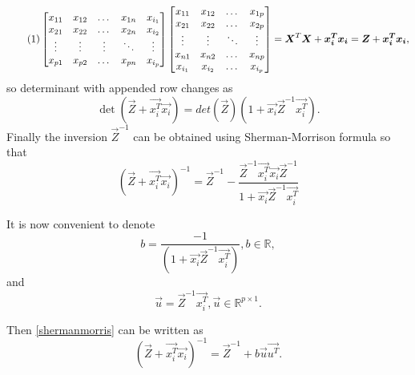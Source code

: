 \[ \numberthis \label{addedrow}
\begin{bmatrix}
    x_{11} & x_{12} & \dots  & x_{1n} & x_{i_1}  \\
    x_{21} & x_{22} & \dots  & x_{2n} & x_{i_2} \\
    \vdots & \vdots & \vdots & \ddots & \vdots \\
    x_{p1} & x_{p2} & \dots  & x_{pn} & x_{i_p}     
\end{bmatrix}
\begin{bmatrix}
    x_{11} & x_{12}  & \dots  & x_{1p} \\
    x_{21} & x_{22}  & \dots  & x_{2p} \\
    \vdots  & \vdots & \ddots & \vdots \\
    x_{n1} & x_{n2}  & \dots  & x_{np} \\
    x_{i_1} & x_{i_2}  & \dots  & x_{i_p}
\end{bmatrix}
 = \vec{X}^T\vec{X} + \vec{x_i^T}\vec{x_i} = \vec{Z} + \vec{x_i^T}\vec{x_i},
\]
so determinant with appended row changes as
\begin{equation} \label{udpateddeterminant}
    \det(\vec{Z} + \vec{x_i^T}\vec{x_i}) = det(\vec{Z})(1 + \vec{x_i}\vec{Z}^{-1}\vec{x_i^T}).
\end{equation}
Finally the inversion $\vec{Z}^{-1}$ can be obtained using Sherman-Morrison formula \cite{bartlett1951inverse} so that 
\begin{equation} \label{shermanmorris}
    (\vec{Z} + \vec{x_i^T}\vec{x_i})^{-1} = \vec{Z}^{-1} - \dfrac{\vec{Z}^{-1}\vec{x_i^T}\vec{x_i}\vec{Z}^{-1}}{1 + \vec{x_i}\vec{Z}^{-1}\vec{x_i^T}}
\end{equation}

It is now convenient to denote 
\begin{equation}
    b = \dfrac{-1}{(1 + \vec{x_i}\vec{Z}^{-1}\vec{x_i^T})},  b \in \mathbb{R},
\end{equation}
and 
\begin{equation} \label{agullo_u}
    \vec{u} = \vec{Z}^{-1}\vec{x_i^T},      \vec{u} \in \mathbb{R}^{p \times 1}.
\end{equation}

Then \eqref{shermanmorris} can be written as
\begin{equation} \label{inversionplus}
    (\vec{Z} + \vec{x_i^T}\vec{x_i})^{-1} = \vec{Z}^{-1} + b\vec{u}\vec{u^T}.
\end{equation}

